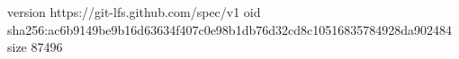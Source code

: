 version https://git-lfs.github.com/spec/v1
oid sha256:ac6b9149be9b16d63634f407c0e98b1db76d32cd8c10516835784928da902484
size 87496

